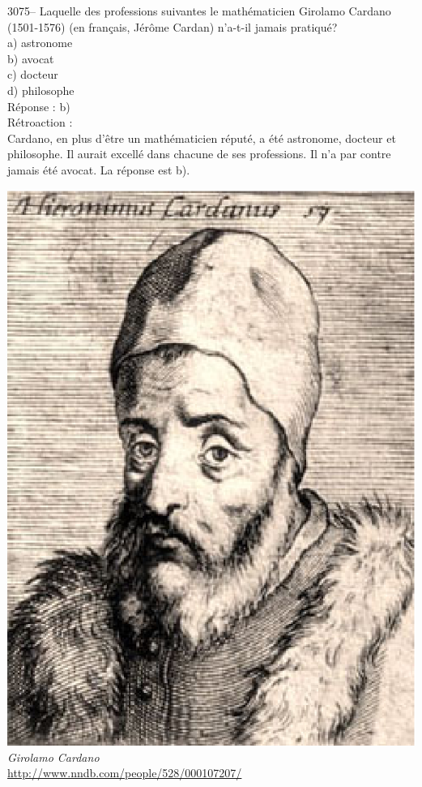 \documentclass[letterpaper, 12pt]{article}
\begin{document}
3075-- Laquelle des professions suivantes le math\'ematicien Girolamo Cardano (1501-1576) (en fran\c cais, J\'er\^ome Cardan) n'a-t-il jamais pratiqu\'e?\\

a) astronome\\
b) avocat\\
c) docteur\\
d) philosophe\\

R\'eponse : b)\\

R\'etroaction :\\
Cardano, en plus d'\^etre un math\'ematicien r\'eput\'e, a \'et\'e astronome, docteur et philosophe. Il aurait excell\'e dans chacune de ses professions. Il n'a par contre jamais \'et\'e avocat. La r\'eponse est b).\\
\begin{center}
\includegraphics[scale=0.25]{Cardano.eps}\\
\emph{{\small Girolamo Cardano}}\\
\href{http://www.nndb.com/people/528/000107207/}{http://www.nndb.com/people/528/000107207/}\\[5mm]
\end{center}
\end{document}
